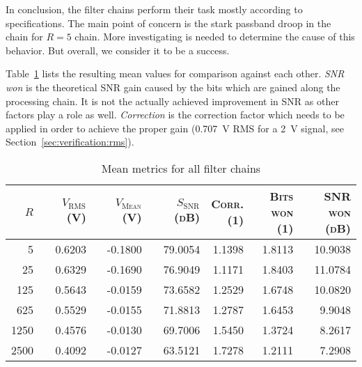 In  conclusion, the  filter  chains  perform their  task  mostly according  to
specifications. The main point  of concern is the stark passband  droop in the
chain for $R=5$ chain. More investigating is  needed to determine the cause of
this behavior. But overall, we consider it to be a success.

Table~\ref{tab:verification:results}  lists  the  resulting  mean  values  for
comparison  against each  other. \emph{SNR  won} is  the theoretical  SNR gain
caused by the bits which are gained  along the processing chain. It is not the
actually achieved  improvement in SNR  as other factors  play a role  as well.
\emph{Correction} is the correction factor which  needs to be applied in order
to achieve the proper gain (\SI{0.707}{\volt} RMS for a \SI{2}{\V_}
signal, see Section~\ref{sec:verification:rms}).

\vfill
\begin{table}[h]
    \centering
    \caption[Mean Metrics for All Filter Chains]{Mean metrics for all filter chains}
    \label{tab:verification:results}
    \begin{tabular}{rrrrrrr}
        \toprule
        {\scshape $R$                 }& 
        {\scshape $V_\mathrm{RMS}$ (\si{V})  }& 
        {\scshape $V_\mathrm{Mean}$ (\si{V}) }& 
        {\scshape $S_\mathrm{SNR}$ (\si{dB}) }&  %
        {\parbox[t]{16mm}{\raggedleft\scshape Corr.\\(\si{1})}}& 
        {\parbox[t]{16mm}{\raggedleft\scshape Bits\\won (\si{1})}}& 
        {\parbox[t]{16mm}{\raggedleft\scshape SNR\\won (\si{dB})}}\\
        \midrule
        5           & 0.6203   & -0.1800   & 79.0054   & 1.1398   & 1.8113   & 10.9038\\
        25          & 0.6329   & -0.1690   & 76.9049   & 1.1171   & 1.8403   & 11.0784\\
        125         & 0.5643   & -0.0159   & 73.6582   & 1.2529   & 1.6748   & 10.0820\\
        625         & 0.5529   & -0.0155   & 71.8813   & 1.2787   & 1.6453   & 9.9048\\
        1250        & 0.4576   & -0.0130   & 69.7006   & 1.5450   & 1.3724   & 8.2617\\
        2500        & 0.4092   & -0.0127   & 63.5121   & 1.7278   & 1.2111   & 7.2908\\
        \bottomrule
    \end{tabular}
\end{table}
\vfill


